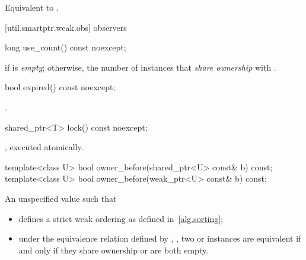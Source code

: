\begin{itemdescr}
\pnum\effects  Equivalent to .
\end{itemdescr}

[util.smartptr.weak.obs]{ observers}
%
%
\begin{itemdecl}
long use_count() const noexcept;
\end{itemdecl}

\begin{itemdescr}
\pnum\returns  {} if  is \textit{empty};
otherwise, the number of  instances
that \textit{share ownership} with .
\end{itemdescr}

%
%
\begin{itemdecl}
bool expired() const noexcept;
\end{itemdecl}

\begin{itemdescr}
\pnum\returns  {}.
\end{itemdescr}

%
%
\begin{itemdecl}
shared_ptr<T> lock() const noexcept;
\end{itemdecl}

\begin{itemdescr}
\pnum\returns  {}, executed atomically.
\end{itemdescr}

%
%
\begin{itemdecl}
template<class U> bool owner_before(shared_ptr<U> const& b) const;
template<class U> bool owner_before(weak_ptr<U> const& b) const;
\end{itemdecl}

\begin{itemdescr}
\pnum
\returns An unspecified value such that

\begin{itemize}
\item {} defines a strict weak ordering as defined in~\ref{alg.sorting};

\item under the equivalence relation defined by ,
, two  or
 instances are equivalent if and only if they share ownership or are
both empty.
\end{itemize}
\end{itemdescr}


